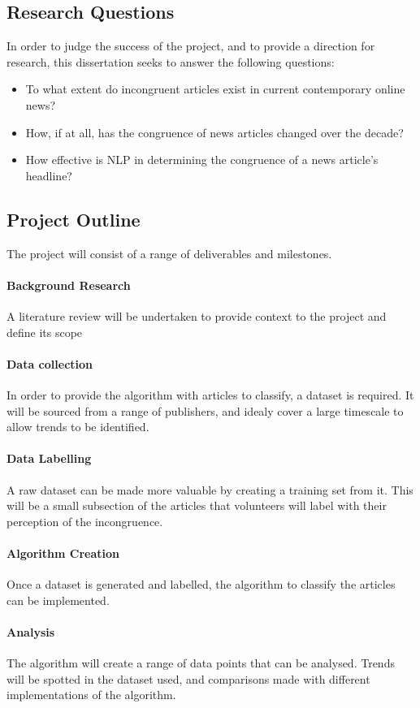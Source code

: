 \subsection{Research Questions}
In order to judge the success of the project, and to provide a direction for research, this dissertation seeks to answer the following questions:
\begin{itemize}
	\item To what extent do incongruent articles exist in current contemporary online news?
	\item How, if at all, has the congruence of news articles changed over the decade?
	\item How effective is NLP in determining the congruence of a news article's headline?
\end{itemize}

\subsection{Project Outline}
The project will consist of a range of deliverables and milestones.
 
\paragraph{Background Research}
A literature review will be undertaken to provide context to the project and define its scope

\paragraph{Data collection}
In order to provide the algorithm with articles to classify, a dataset is required. It will be sourced from a range of publishers, and idealy cover a large timescale to allow trends to be identified.

\paragraph{Data Labelling}
A raw dataset can be made more valuable by creating a training set from it. This will be a small subsection of the articles that volunteers will label with their perception of the incongruence.

\paragraph{Algorithm Creation}
Once a dataset is generated and labelled, the algorithm to classify the articles can be implemented. 

\paragraph{Analysis}
The algorithm will create a range of data points that can be analysed. Trends will be spotted in the dataset used, and comparisons made with different implementations of the algorithm.
